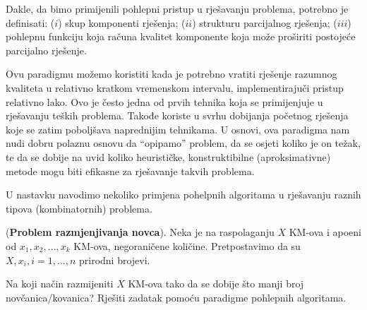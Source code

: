 Dakle, da bimo primijenili pohlepni pristup u rješavanju problema, potre\-bno je definisati: ($i$) skup komponenti rješenja; ($ii$) strukturu parcijalnog rješenja; ($iii$) pohlepnu funkciju koja računa kvalitet kompo\-nente koja može proširiti postojeće parcijalno rješenje.



Ovu paradigmu možemo koristiti kada je potrebno vratiti rješenje razu\-mnog kvaliteta   u relativno kratkom vremenskom intervalu, imple\-mentirajuči pristup relativno lako. Ovo je često jedna od prvih tehnika koja se primijenju\-je u rješavanju teških 
problema. Takođe koriste u svrhu dobijanja početnog rješenja koje se zatim  poboljšava naprednijim tehnikama. U osnovi, ova paradigma nam nudi dobru polaznu osnovu da ``opipamo'' problem, da se osjeti  koliko je on težak, te da se dobije na uvid koliko heurističke, konstrukti\-bilne (aproksimativne) metode mogu biti efikasne za rješavanje takvih proble\-ma.

U nastavku navodimo nekoliko primjena pohelpnih algoritama u rješavanju raznih tipova (kombinatornih) problema. 



\begin{example}(\textbf{Problem razmjenjivanja novca}). 
 Neka je na ra\-spolaganju  $X$ KM-ova i apoeni od $x_1, x_2, \ldots , x_k$ KM-ova, negoraničene količine. Pretpo\-stavimo da su $X, x_i, i=1,\ldots, n$ prirodni brojevi.

Na koji način razmijeniti $X$ KM-ova tako da se dobije što manji broj
novčanica/kovanica? Rješiti zadatak pomoću paradigme pohlepnih algoritama.
\end{example}

